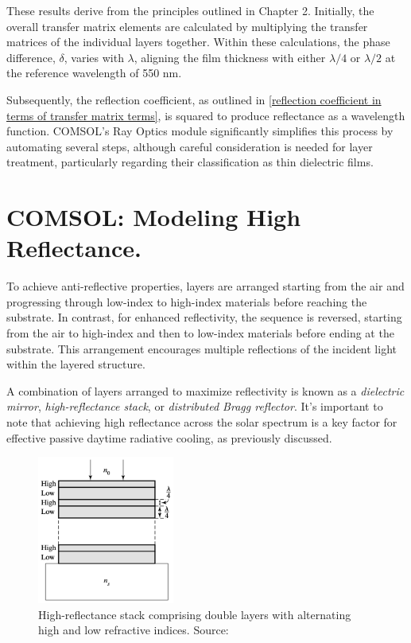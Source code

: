 These results derive from the principles outlined in Chapter 2. Initially, the overall transfer matrix elements are calculated by multiplying the transfer matrices of the individual layers together. Within these calculations, the phase difference, $\delta$, varies with $\lambda$, aligning the film thickness with either $\lambda/4$ or $\lambda/2$ at the reference wavelength of 550 nm.

Subsequently, the reflection coefficient, as outlined in \ref{reflection coefficient in terms of transfer matrix terms}, is squared to produce reflectance as a wavelength function. COMSOL's Ray Optics module significantly simplifies this process by automating several steps, although careful consideration is needed for layer treatment, particularly regarding their classification as thin dielectric films.

\section{COMSOL: Modeling High Reflectance.}
To achieve anti-reflective properties, layers are arranged starting from the air and progressing through low-index to high-index materials before reaching the substrate. In contrast, for enhanced reflectivity, the sequence is reversed, starting from the air to high-index and then to low-index materials before ending at the substrate. This arrangement encourages multiple reflections of the incident light within the layered structure.

A combination of layers arranged to maximize reflectivity is known as a \emph{dielectric mirror}, \emph{high-reflectance stack}, or \emph{distributed Bragg reflector}. It's important to note that achieving high reflectance across the solar spectrum is a key factor for effective passive daytime radiative cooling, as previously discussed.

\begin{figure}[ht!]
  \centering
  \includegraphics[width=0.4\textwidth]{Chapters/Figures/Chapter 4 Figures/High-Reflectance Stack of Double Layers.png}
  \caption{High-reflectance stack comprising double layers with alternating high and low refractive indices. Source: \cite{pedrotti_introduction_2007}}
  \label{fig:visualizing high-reflectance stack with alternating indices}
\end{figure}

